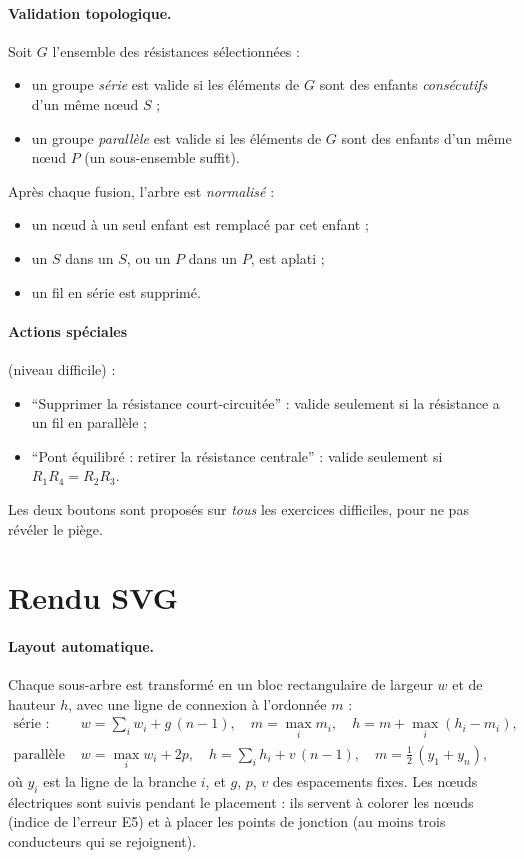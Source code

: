 \documentclass[11pt,a4paper]{report}
\begin{document}
\paragraph{Validation topologique.} Soit $G$ l'ensemble des résistances sélectionnées :
\begin{itemize}
  \item un groupe \emph{série} est valide si les éléments de $G$ sont des enfants \emph{consécutifs} d'un même nœud $S$ ;
  \item un groupe \emph{parallèle} est valide si les éléments de $G$ sont des enfants d'un même nœud $P$ (un sous-ensemble suffit).
\end{itemize}
Après chaque fusion, l'arbre est \emph{normalisé} :
\begin{itemize}
  \item un nœud à un seul enfant est remplacé par cet enfant ;
  \item un $S$ dans un $S$, ou un $P$ dans un $P$, est aplati ;
  \item un fil en série est supprimé.
\end{itemize}

\paragraph{Actions spéciales} (niveau difficile) :
\begin{itemize}
  \item \enquote{Supprimer la résistance court-circuitée} : valide seulement si la résistance a un fil en parallèle ;
  \item \enquote{Pont équilibré : retirer la résistance centrale} : valide seulement si $R_1 R_4 = R_2 R_3$.
\end{itemize}
Les deux boutons sont proposés sur \emph{tous} les exercices difficiles, pour ne pas révéler le piège.

\section{Rendu SVG}
\paragraph{Layout automatique.} Chaque sous-arbre est transformé en un bloc rectangulaire de largeur $w$ et de hauteur $h$, avec une ligne de connexion à l'ordonnée $m$ :
\begin{align}
  \text{série : } & w = \sum_i w_i + g\,(n-1), \quad m = \max_i m_i, \quad h = m + \max_i (h_i - m_i), \\
  \text{parallèle : } & w = \max_i w_i + 2p, \quad h = \sum_i h_i + v\,(n-1), \quad m = \tfrac12\,(y_1 + y_n),
\end{align}
où $y_i$ est la ligne de la branche $i$, et $g$, $p$, $v$ des espacements fixes. Les nœuds électriques sont suivis pendant le placement : ils servent à colorer les nœuds (indice de l'erreur E5) et à placer les points de jonction (au moins trois conducteurs qui se rejoignent).
\end{document}
